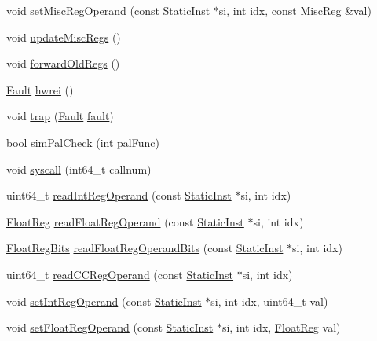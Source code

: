 \begin{DoxyCompactItemize}
\item 
void \hyperlink{classBaseO3DynInst_a6cfad8f780bab7feb893941cb0d46160}{setMiscRegOperand} (const \hyperlink{classStaticInst}{StaticInst} $\ast$si, int idx, const \hyperlink{classBaseO3DynInst_aaf5f073a387db0556d1db4bcc45428bc}{MiscReg} \&val)
\item 
void \hyperlink{classBaseO3DynInst_a56cd11ccc7171772c548bcb4b959ef61}{updateMiscRegs} ()
\item 
void \hyperlink{classBaseO3DynInst_ac07a6c1a7a4d279a8b360729e0777208}{forwardOldRegs} ()
\item 
\hyperlink{classRefCountingPtr}{Fault} \hyperlink{classBaseO3DynInst_a5f42e07ae335dff417664e91518c7f1e}{hwrei} ()
\item 
void \hyperlink{classBaseO3DynInst_ac74f75adb89c94e4387498067f5567ff}{trap} (\hyperlink{classRefCountingPtr}{Fault} \hyperlink{classBaseDynInst_a68714ceb74c60ea7ef5dec335bb6c5d7}{fault})
\item 
bool \hyperlink{classBaseO3DynInst_a461205960be9d52e9beda48a77e9c600}{simPalCheck} (int palFunc)
\item 
void \hyperlink{classBaseO3DynInst_a36e0b96120fcbbc2ee8699158f7be5c2}{syscall} (int64\_\-t callnum)
\item 
uint64\_\-t \hyperlink{classBaseO3DynInst_a9e7b0a4d5373c48902425c9456b19e7e}{readIntRegOperand} (const \hyperlink{classStaticInst}{StaticInst} $\ast$si, int idx)
\item 
\hyperlink{classBaseO3DynInst_a75484259f1855aabc8d74c6eb1cfe186}{FloatReg} \hyperlink{classBaseO3DynInst_a717c88c8c56d79c9ed554ba5992bd8c3}{readFloatRegOperand} (const \hyperlink{classStaticInst}{StaticInst} $\ast$si, int idx)
\item 
\hyperlink{classBaseO3DynInst_aab5eeae86499f9bfe15ef79360eccc64}{FloatRegBits} \hyperlink{classBaseO3DynInst_a39d93624e4481f4a210f2c46ea6b15b0}{readFloatRegOperandBits} (const \hyperlink{classStaticInst}{StaticInst} $\ast$si, int idx)
\item 
uint64\_\-t \hyperlink{classBaseO3DynInst_a25532f176443f0ec538a3b833c55f4a0}{readCCRegOperand} (const \hyperlink{classStaticInst}{StaticInst} $\ast$si, int idx)
\item 
void \hyperlink{classBaseO3DynInst_a654e99f2be7cd298378462ce9651bb44}{setIntRegOperand} (const \hyperlink{classStaticInst}{StaticInst} $\ast$si, int idx, uint64\_\-t val)
\item 
void \hyperlink{classBaseO3DynInst_addc8b4b6511725bf8ff48bd09ef22892}{setFloatRegOperand} (const \hyperlink{classStaticInst}{StaticInst} $\ast$si, int idx, \hyperlink{classBaseO3DynInst_a75484259f1855aabc8d74c6eb1cfe186}{FloatReg} val)

\end{DoxyCompactItemize}
